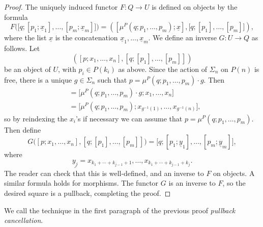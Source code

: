 \begin{proof}
The uniquely induced functor $F \colon Q \to U$ is defined on objects by the formula
    \[
F\Big(\big[q;\left[p_1;\underline{x}_1\right],\ldots,\left[p_m;\underline{x}_m\right]\big] \Big) =          \left(\left[\mu^P(q;p_1,\ldots,p_m);\underline{x}\right], \big[q;[p_1],\ldots,[p_m]\big]\right),
    \]
where the list $\underline{x}$ is the concatenation $\underline{x}_1, \ldots, \underline{x}_m$.
We define an inverse $G \colon U \to Q$ as follows.
Let 
    \[
        \left([p;x_1,\ldots,x_{n}],[q;[p_1],\ldots,[p_m]]\right)
    \]
be an object of $U$, with $p_i \in P(k_i)$ as above. 
Since the action of $\Sigma_n$ on $P(n)$ is free, there is a unique $g \in \Sigma_n$ such that $p  = \mu^P(q;p_1,\ldots,p_m) \cdot g$. Then
\begin{align*}
[p; x_1, \ldots, x_n] & = \big[ \mu^P(q;p_1,\ldots,p_m) \cdot g; x_1, \ldots, x_n \big] \\
& = \big[ \mu^P(q;p_1,\ldots,p_m); x_{g^{-1}(1)}, \ldots, x_{g^{-1}(n)} \big],
\end{align*}
so by reindexing the $x_i$'s if necessary we can assume that $p =  \mu^P(q;p_1,\ldots,p_m)$.
Then define
\[
G\Big( [p;x_1,\ldots,x_{n}],[q;[p_1],\ldots,[p_m]] \Big) = \big[ q; [p_1; \underline{y}_1], \ldots, [p_m; \underline{y}_m] \big],
\]
where 
\[
\underline{y_j} = x_{k_1 + \cdots + k_{j-1} + 1}, \ldots, x_{k_1 + \cdots + k_{j-1} + k_j}.
\]
The reader can check that this is well-defined, and an inverse to $F$ on objects. A similar formula holds for morphisms. The functor $G$ is an inverse to $F$, so the desired square is a pullback, completing the proof.
\end{proof}

\begin{rem}\label{rem:pb-cancel}
We call the technique in the first paragraph of the previous proof \emph{pullback cancellation}.
\end{rem}

